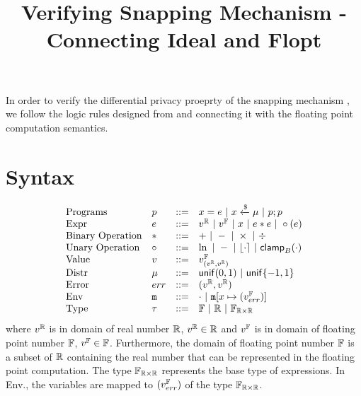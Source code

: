 \documentclass[a4paper,11pt]{article}
\begin{document}
\title{Verifying Snapping Mechanism - Connecting Ideal and Flopt}
\author{}

\date{}

\maketitle
In order to verify the differential privacy proeprty of
the snapping mechanism \cite{mironov2012significance},
we follow the logic rules designed from
\cite{barthe2016proving} and connecting 
it with the floating point computation semantics.
\section{Syntax}
\[\begin{array}{llll}
\mbox{Programs} & \prog & ::= & 
     \varx = \expr ~|~ \varx \samplel \edistr
	~|~ \prog ; \prog \\

\mbox{Expr} & \expr & ::= & \rval  ~|~  \fval
	~|~ \varx  ~|~ \expr \bop \expr
	~|~ \uop (\expr) \\
%
\mbox{Binary Operation} & \bop & ::= & + ~|~ - ~|~ \times ~|~ \div \\
%
\mbox{Unary Operation} & \uop & ::= & \ln ~|~ - ~|~ \round{\cdot} 
	~|~ \clamp_B(\cdot) \\
%
\mbox{Value} & \valv & ::= & \fval_{(\rval, \rval)}\\
%
\mbox{Distr} & \edistr & ::= & \uniform(0, 1) 
%
	~|~ \uniform\{-1, 1\}\\ 
%
\mbox{Error} & \err & ::= & (\rval, \rval) \\
%
\mbox{Env} & \trsmem & ::= & \cdot ~|~ \trsmem[x \mapsto (\fval_{\err})]\\
%
\mbox{Type} & \tau & ::= & \float ~|~ \real ~|~ \float_{\real \times \real}
\end{array}
\]
where $v^{\mathbb{R}}$ is in domain of real number $\mathbb{R}$, $v^{\mathbb{R}} \in \mathbb{R}$ and $v^{\mathbb{F}}$ is in domain of floating point number $\mathbb{F}$, $v^{\mathbb{F}} \in \mathbb{F}$. Furthermore, the domain of floating point number $\mathbb{F}$ is a subset of $\mathbb{R}$ containing the real number that can be represented in the floating point computation. The type $\mathbb{F}_{\mathbb{R} \times \mathbb{R}}$ represents the base type of expressions. In Env., the variables are mapped to $(v^{\mathbb{F}}_{err})$ of the type $\mathbb{F}_{\mathbb{R} \times \mathbb{R}}$.


%
\end{document}
